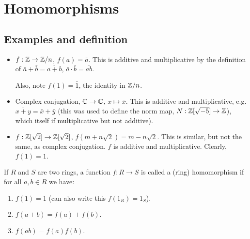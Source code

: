 \documentclass[10pt, a4paper]{article}
\begin{document}
\newpage

\section{Homomorphisms}

\subsection{Examples and definition}

\begin{itemize}
    \item $f : \mathbb{Z} \to \mathbb{Z} / n$,
    $f(a) = \bar{a}$.
    This is additive and multiplicative by the definition of $\bar{a} + \bar{b} = \overline{a + b}$,
    $\bar{a} \cdot \bar{b} = \overline{ab}$.

    Also,
    note $f(1) = \bar{1}$,
    the identity in $\mathbb{Z} / n$.

    \item Complex conjugation,
    $\mathbb{C} \to \mathbb{C}$,
    $x \mapsto \bar{x}$.
    This is additive and multiplicative,
    e.g. $\overline{x + y} = \bar{x} + \bar{y}$
    (this was used to define the norm map,
    $N : \mathbb{Z}[\sqrt{-5}] \to \mathbb{Z}$),
    which itself if multiplicative but not additive).

    \item $f : \mathbb{Z}[\sqrt{2}] \to \mathbb{Z}[\sqrt{2}]$,
    $f(m + n\sqrt{2}) = m - n\sqrt{2}$.
    This is similar,
    but not the same,
    as complex conjugation.
    $f$ is additive and multiplicative.
    Clearly,
    $f(1) = 1$.
\end{itemize}

\begin{definition}
    If $R$ and $S$ are two rings,
    a function $f : R \to S$ is called a
    (ring)
    homomorphism if for all $a, b \in R$ we have:
    \begin{enumerate}[label = (\roman*)]
        \item $f(1) = 1$
        (can also write this $f(1_{R}) = 1_{S}$).

        \item $f(a + b) = f(a) + f(b)$.

        \item $f(ab) = f(a)f(b)$.
    \end{enumerate}
\end{definition}
\end{document}
